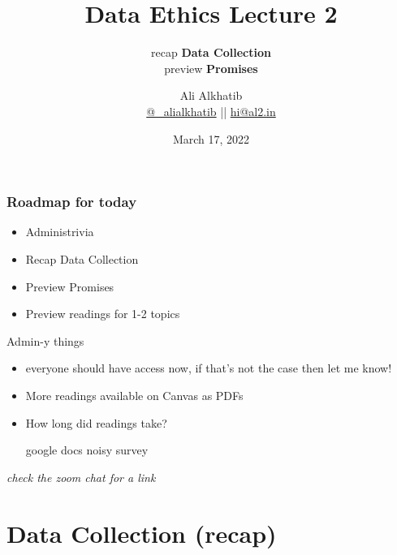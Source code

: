 \documentclass[aspectratio=43,17pt]{beamer} %
\title{Data Ethics Lecture 2}
\subtitle{recap {\bfseries Data Collection}\\preview {\bfseries Promises}}
\author[Ali Alkhatib]{{Ali Alkhatib}\\
\href{http://twitter.com/_alialkhatib}{@\_alialkhatib} || \href{mailto:hi@al2.in}{hi@al2.in}}
\date{March 17, 2022}
\newcommand{\onlyinsubfile}[1]{#1}
\newcommand{\notinsubfile}[1]{}
\begin{document}
\renewcommand{\onlyinsubfile}[1]{}
\renewcommand{\notinsubfile}[1]{#1}


\begin{frame}
\titlepage
\end{frame}

\begin{frame}[t]\frametitle{Roadmap for today}

\begin{itemize}
    \item Administrivia
    \item Recap Data Collection
    \item Preview Promises
    \item Preview readings for 1-2 topics
\end{itemize}

\end{frame}


\begin{frame}{Admin-y things}
  

\begin{itemize}
    \item {}
    
    {\small everyone should have access now, if that's not the case then let me know!}
    \item {}
    
    {\small More readings available on Canvas as PDFs}
    \item {}

    {\small How long did readings take?

    \MVRightarrow{} google docs noisy survey}
    
\end{itemize}

\end{frame}

\begin{frame}[plain]

\centering
\emph{check the zoom chat for a link}

\end{frame}


\section{Data Collection (recap)}
\end{document}
